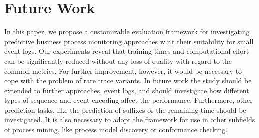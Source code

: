 \documentclass[runningheads]{llncs}
\begin{document}
\section{Future Work}\label{Sec:Conclusions-and-Future-Work}
\vspace{-8pt}
In this paper, we propose a customizable evaluation framework for investigating predictive business process monitoring approaches w.r.t their suitability for small event logs. Our experiments reveal that training times and computational effort can be significantly reduced without any loss of quality with regard to the common metrics. For further improvement, however, it would be necessary to cope with the problem of rare trace variants. In future work the study should be extended to further approaches, event logs, and should investigate how different types of sequence and event encoding affect the performance. Furthermore, other prediction tasks, like the prediction of suffixes or the remaining time should be investigated. It is also necessary to adopt the framework for use in other subfields of process mining, like process model discovery or conformance checking.



%
%
%
% 
% 
%

\tiny


\end{document}
